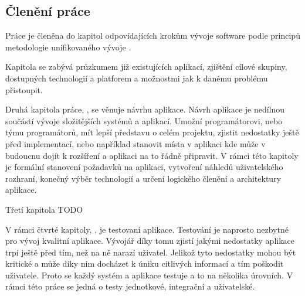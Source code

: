 \begin{introduction}
    \section{Členění práce}
    Práce je členěna do kapitol odpovídajících krokům vývoje software podle principů metodologie unifikovaného vývoje \cite[s.~51-68]{arlow_2007_uml}.

    Kapitola  se zabývá průzkumem již existujících aplikací, zjištění cílové skupiny, dostupných technologií a platforem a možnostmi jak k danému problému přistoupit.

    Druhá kapitola práce, , se věnuje návrhu aplikace. Návrh aplikace je nedílnou součástí vývoje složitějších systémů a aplikací. Umožní programátorovi, nebo týmu programátorů, mít lepší představu o celém projektu, zjistit nedostatky ještě před implementací, nebo například stanovit místa v aplikaci kde může v budoucnu dojít k rozšíření a aplikaci na to řádně připravit. V rámci této kapitoly je formální stanovení požadavků na aplikaci, vytvoření náhledů uživatelského rozhraní, konečný výběr technologií a určení logického členění a architektury aplikace.

    Třetí kapitola TODO

    V rámci čtvrté kapitoly, , je testovaní aplikace. Testování je naprosto nezbytné pro vývoj kvalitní aplikace. Vývojář díky tomu zjistí jakými nedostatky aplikace trpí ještě před tím, než na ně narazí uživatel. Jelikož tyto nedostatky mohou být kritické a může díky nim docházet k úniku citlivých informací a tím poškodit uživatele. Proto se každý systém a aplikace testuje a to na několika úrovních. V rámci této práce se jedná o testy jednotkové, integrační a uživatelské.
\end{introduction}